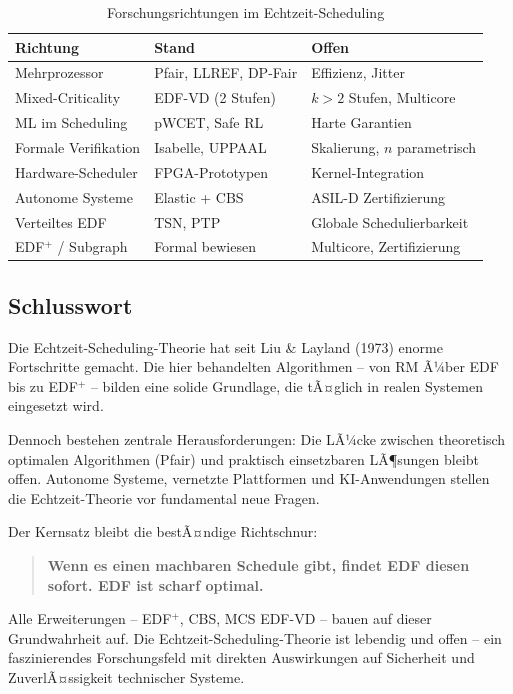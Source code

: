 ﻿\documentclass[a4paper,12pt]{report}
\theoremstyle{definition}
\begin{document}
\begin{table}[H]
	\centering
	\caption{Forschungsrichtungen im Echtzeit-Scheduling}
	\begin{tabular}{p{3.8cm}p{3.8cm}p{3.8cm}}
		\toprule
		\textbf{Richtung} & \textbf{Stand} & \textbf{Offen} \\
		\midrule
		Mehrprozessor & Pfair, LLREF, DP-Fair & Effizienz, Jitter \\
		Mixed-Criticality & EDF-VD (2 Stufen) & $k > 2$ Stufen, Multicore \\
		ML im Scheduling & pWCET, Safe RL & Harte Garantien \\
		Formale Verifikation & Isabelle, UPPAAL & Skalierung, $n$ parametrisch \\
		Hardware-Scheduler & FPGA-Prototypen & Kernel-Integration \\
		Autonome Systeme & Elastic + CBS & ASIL-D Zertifizierung \\
		Verteiltes EDF & TSN, PTP & Globale Schedulierbarkeit \\
		EDF$^+$ / Subgraph & Formal bewiesen & Multicore, Zertifizierung \\
		\bottomrule
	\end{tabular}
\end{table}

\subsection{Schlusswort}

Die Echtzeit-Scheduling-Theorie hat seit Liu \& Layland (1973) enorme
Fortschritte gemacht. Die hier behandelten Algorithmen -- von RM Ã¼ber EDF
bis zu EDF$^+$ -- bilden eine solide Grundlage, die tÃ¤glich in realen
Systemen eingesetzt wird.

Dennoch bestehen zentrale Herausforderungen: Die LÃ¼cke zwischen theoretisch
optimalen Algorithmen (Pfair) und praktisch einsetzbaren LÃ¶sungen bleibt
offen. Autonome Systeme, vernetzte Plattformen und KI-Anwendungen stellen
die Echtzeit-Theorie vor fundamental neue Fragen.

Der Kernsatz bleibt die bestÃ¤ndige Richtschnur:

\begin{quote}
\textbf{Wenn es einen machbaren Schedule gibt, findet EDF diesen sofort.
EDF ist scharf optimal.}
\end{quote}

Alle Erweiterungen -- EDF$^+$, CBS, MCS EDF-VD -- bauen auf dieser Grundwahrheit
auf. Die Echtzeit-Scheduling-Theorie ist lebendig und offen -- ein faszinierendes
Forschungsfeld mit direkten Auswirkungen auf Sicherheit und ZuverlÃ¤ssigkeit
technischer Systeme.
\end{document}
